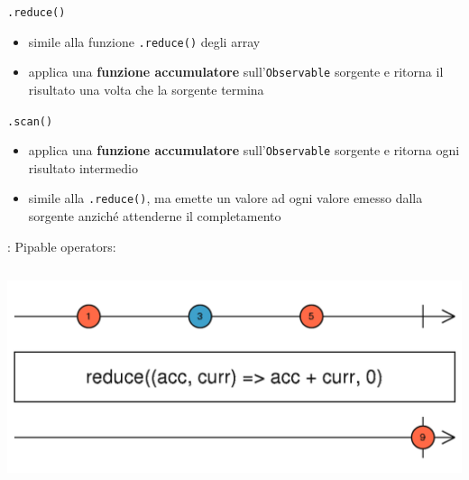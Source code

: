             \begin{frame}{\insertsubsectionhead}{}
                \begin{block}{\texttt{.reduce()}}
                    \begin{itemize}
                        \item
                            simile alla funzione \texttt{.reduce()} degli array
                        \item
                            applica una \textbf{funzione accumulatore} sull'\texttt{Observable} sorgente e ritorna il risultato una volta che la sorgente termina
                    \end{itemize}
                \end{block}

                \begin{block}{\texttt{.scan()}}
                    \begin{itemize}
                        \item
                            applica una \textbf{funzione accumulatore} sull'\texttt{Observable} sorgente e ritorna ogni risultato intermedio
                        \item
                            simile alla \texttt{.reduce()}, ma emette un valore ad ogni valore emesso dalla sorgente anziché attenderne il completamento
                    \end{itemize}
                \end{block}

            \end{frame}

            \begin{frame}[fragile]{\insertsubsectionhead}{: Pipable operators: \texttt{\insertsubsubsectionhead}}
                \inputminted{js}{src/reduce.js}
                \includegraphics[width=\linewidth]{reduce}
            \end{frame}

